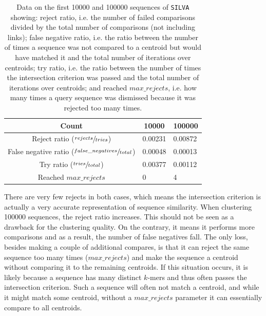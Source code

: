 \begin{table}[H]
  \centering
  \begin{tabular}{c||l|l}
  Count                                                    & \multicolumn{1}{c|}{\num{10000}} & \multicolumn{1}{c}{\num{100000}} \\
  \hline\hline
  Reject ratio ($\sfrac{rejects}{tries}$)                  & 0.00231                          & 0.00872                          \\
  \hline
  False negative ratio ($\sfrac{false\_negatives}{total}$) & 0.00048                          & 0.00013                          \\
  \hline
  Try ratio ($\sfrac{tries}{total}$)                       & 0.00377                          & 0.00112                          \\
  \hline
  Reached $max\_rejects$                                   & 0                                & 4                                \\
  \end{tabular}
  \caption{Data on the first \num{10000} and \num{100000} sequences of
  \texttt{SILVA} showing: reject ratio, i.e. the number of failed comparisons
  divided by the total number of comparisons (not including links); false
  negative ratio, i.e. the ratio between the number of times a sequence was not
  compared to a centroid but would have matched it and the total number of
  iterations over centroids; try ratio, i.e. the ratio between the number of
  times the intersection criterion was passed and the total number of
  iterations over centroids; and reached $max\_rejects$, i.e. how many times a
  query sequence was dismissed because it was rejected too many times.}
  \label{tab:centroid_search_data}
\end{table}

There are very few rejects in both cases, which means the intersection
criterion is actually a very accurate representation of sequence similarity.
When clustering \num{100000} sequences, the reject ratio increases. This should
not be seen as a drawback for the clustering quality. On the contrary, it means
it performs more comparisons and as a result, the number of false negatives
fall. The only loss, besides making a couple of additional compares, is that it
can reject the same sequence too many times ($max\_rejects$) and make the
sequence a centroid without comparing it to the remaining centroids. If this
situation occurs, it is likely because a sequence has many distinct $k$-mers
and thus often passes the intersection criterion. Such a sequence will often
not match a centroid, and while it might match some centroid, without a
$max\_rejects$ parameter it can essentially compare to all centroids.

